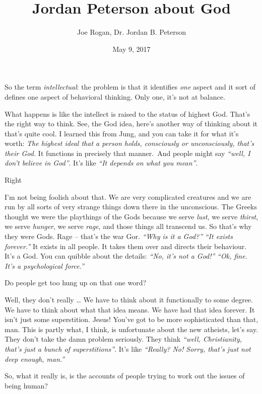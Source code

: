 \documentclass{memoir}
\title{Jordan Peterson about God}
\author{Joe Rogan, Dr. Jordan B. Peterson}
\date{May 9, 2017}
\newcommand{\qq}[1]{\emph{“#1”}}
\begin{document}
\maketitle{}


\begin{drama}

\jrspeaks So the term \emph{intellectual}: the problem is that it identifies \emph{one} aspect and it sort of defines one aspect of behavioral thinking. Only one, it’s not at balance.

\jpspeaks What happens is like the intellect is raised to the status of highest God. That’s the right way to think. See, the God idea, here’s another way of thinking about it that’s quite cool. I learned this from Jung, and you can take it for what it’s worth: \emph{The highest ideal that a person holds, consciously or unconsciously, that’s their God.} It functions in precisely that manner. And people might say \qq{well, I don’t believe in God}. It’s like \qq{It depends on what you mean}.

\jrspeaks Right

\jpspeaks I’m not being foolish about that. We are very complicated creatures and we are run by all sorts of very strange things down there in the unconscious. The Greeks thought we were the playthings of the Gods because we serve \emph{lust}, we serve \emph{thirst}, we serve \emph{hunger}, we serve \emph{rage}, and those things all transcend us. So that’s why they were Gods. Rage -- that’s the war Gor. \qq{Why is it a God?} \qq{It exists forever.} It exists in all people. It takes them over and directs their behaviour. It’s a God. You can quibble about the details: \qq{No, it’s not a God!} \qq{Ok, fine. It’s a psychological force.}

\jrspeaks Do people get too hung up on that one word?

\jpspeaks Well, they don’t really \ldots{} We have to think about it functionally to some degree. We have to think about what that idea means. We have had that idea forever. It isn’t just some superstition. Jesus! You’ve got to be more sophisticated than that, man. This is partly what, I think, is unfortunate about the new atheists, let’s say. They don’t take the damn problem seriously. They think \qq{well, Christianity, that’s just a bunch of superstitions}. It’s like \qq{Really? No! Sorry, that’s just not deep enough, man.}

\jrspeaks So, what it really is, is the accounts of people trying to work out the issues of being human?


\end{drama}
\end{document}
